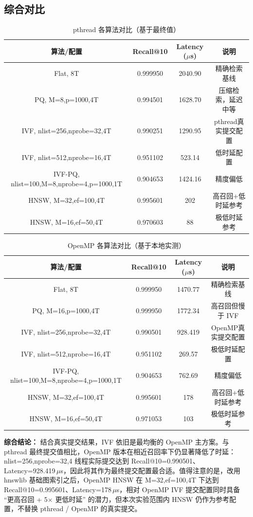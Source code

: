 \documentclass[a4paper]{article}
\begin{document}
\subsection{综合对比}

\begin{table}[htbp]
\centering
\caption{pthread 各算法对比（基于最终值）}
\begin{tabular}{cccc}
\toprule
算法/配置 & Recall@10 & Latency ($\mu$s) & 说明 \\
\midrule
Flat, 8T & 0.999950 & 2040.90 & 精确检索基线 \\
PQ, M=8,p=1000,4T & 0.994501 & 1628.70 & 压缩检索，延迟中等 \\
IVF, nlist=256,nprobe=32,4T & 0.990251 & 1290.95 & pthread真实提交配置 \\
IVF, nlist=512,nprobe=16,4T & 0.951102 & 523.14 & 低时延配置 \\
IVF-PQ, nlist=100,M=8,nprobe=4,p=1000,1T & 0.904653 & 1424.16 & 精度偏低 \\
HNSW, M=32,ef=100,4T & 0.995601 & 202 & 高召回+低时延参考 \\
HNSW, M=16,ef=50,4T & 0.970603 & 88  & 极低时延参考 \\
\bottomrule
\end{tabular}
\end{table}

\begin{table}[htbp]
\centering
\caption{OpenMP 各算法对比（基于本地实测）}
\begin{tabular}{cccc}
\toprule
算法/配置 & Recall@10 & Latency ($\mu$s) & 说明 \\
\midrule
Flat, 8T & 0.999950 & 1470.77 & 精确检索基线 \\
PQ, M=16,p=1000,4T & 0.999950 & 1772.34 & 高召回但慢于 IVF \\
IVF, nlist=256,nprobe=32,4T & 0.990501 & 928.419 & OpenMP真实提交配置 \\
IVF, nlist=512,nprobe=16,4T & 0.951102 & 269.57 & 极低时延配置 \\
IVF-PQ, nlist=100,M=8,nprobe=4,p=1000,1T & 0.904653 & 762.69 & 精度偏低 \\
HNSW, M=32,ef=100,4T & 0.995601 & 178 & 高召回+低时延参考 \\
HNSW, M=16,ef=50,4T & 0.971053 & 103 & 极低时延参考 \\
\bottomrule
\end{tabular}
\end{table}

\textbf{综合结论：} 结合真实提交结果，IVF 依旧是最均衡的 OpenMP 主方案。与 pthread 最终提交值相比，OpenMP 版本在相近召回率下仍显著降低了时延：nlist=256,nprobe=32,4 线程实际提交达到 Recall@10=0.990501、Latency=928.419\,$\mu$s，因此将其作为最终提交配置最合适。值得注意的是，改用 hnswlib 基础图索引之后，OpenMP HNSW 在 M=32,ef=100,4T 下达到 Recall@10=0.995601、Latency=178\,$\mu$s，相对 OpenMP IVF 提交配置同时具备 ``更高召回 + 5$\times$ 更低时延'' 的潜力，但本次实验范围内 HNSW 仍作为参考配置，不替换 pthread / OpenMP 的真实提交。
\end{document}
